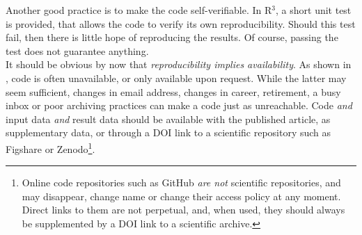 \documentclass[a4paper,11pt]{article}
\begin{document}
Another good practice is to make the code self-verifiable. In R$^3$, a short unit test is provided, that allows the code to verify its own reproducibility. Should this test fail, then there is little hope of reproducing the results. Of course, passing the test does not guarantee anything.\\

It should be obvious by now that \emph{reproducibility implies availability}. As shown in \citep{Collberg:2016}, code is often unavailable, or only available upon request. While the latter may seem sufficient, changes in email address, changes in career, retirement, a busy inbox or poor archiving practices can make a code just as unreachable. Code \emph{and} input data \emph{and} result data should be available with the published article, as supplementary data, or through a DOI link to a scientific repository such as Figshare or Zenodo\footnote{Online code repositories such as GitHub \emph{are not} scientific repositories, and may disappear, change name or change their access policy at any moment. Direct links to them are not perpetual, and, when used, they should always be supplemented by a DOI link to a scientific archive.}.\\
\end{document}
